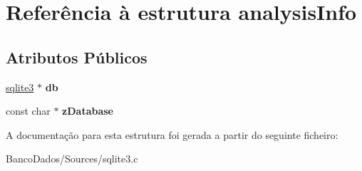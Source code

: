 \hypertarget{structanalysis_info}{\section{Referência à estrutura analysis\-Info}
\label{structanalysis_info}
}
\subsection*{Atributos Públicos}
\begin{DoxyCompactItemize}
\item 
\hypertarget{structanalysis_info_a13108eadc55ffe73a8825fb91cc0f9b5}{\hyperlink{structsqlite3}{sqlite3} $\ast$ {\bfseries db}}\label{structanalysis_info_a13108eadc55ffe73a8825fb91cc0f9b5}

\item 
\hypertarget{structanalysis_info_accbe3c1f5613ffa13b9578e58a5d850a}{const char $\ast$ {\bfseries z\-Database}}\label{structanalysis_info_accbe3c1f5613ffa13b9578e58a5d850a}

\end{DoxyCompactItemize}


A documentação para esta estrutura foi gerada a partir do seguinte ficheiro\-:\begin{DoxyCompactItemize}
\item 
Banco\-Dados/\-Sources/sqlite3.\-c\end{DoxyCompactItemize}
